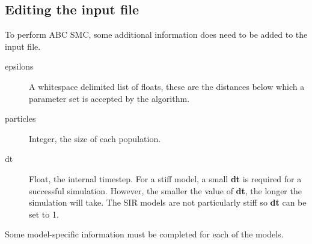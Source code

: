 \documentclass[a4paper]{report}
\begin{document}
\subsection{Editing the input file}
To perform ABC SMC, some additional information does need to be added to the input file.
\begin{description}
\item[epsilons] A whitespace delimited list of floats, these are the distances below which a parameter set is accepted by the algorithm.
\item[particles] Integer, the size of each population. 
\item[dt] Float, the internal timestep. For a stiff model, a small \textbf{dt} is required for a successful simulation. However, the smaller the value of \textbf{dt}, the longer the simulation will take. The SIR models are not particularly stiff so \textbf{dt} can be set to 1.
\end{description}
Some model-specific information must be completed for each of the models.
\end{document}
